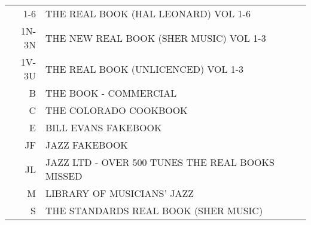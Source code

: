 \documentclass[8pt]{scrartcl}
\begin{document}
\selectfont
\begin{center}
  \begin{tabular}{r@{\quad=\quad}l}1-6 & THE REAL BOOK (HAL LEONARD) VOL 1-6\\
    1N-3N & THE NEW REAL BOOK (SHER MUSIC) VOL 1-3\\
    1V-3U & THE REAL BOOK (UNLICENCED) VOL 1-3\\
    B & THE BOOK - COMMERCIAL\\
    C & THE COLORADO COOKBOOK\\
    E & BILL EVANS FAKEBOOK\\
    JF & JAZZ FAKEBOOK\\
    JL & JAZZ LTD - OVER 500 TUNES THE REAL BOOKS MISSED\\
    M & LIBRARY OF MUSICIANS’ JAZZ\\
    S & THE STANDARDS REAL BOOK (SHER MUSIC)\\
  \end{tabular}
\end{center}

\begin{multicols}{3}
  \raggedright
  
\end{multicols}
\end{document}
